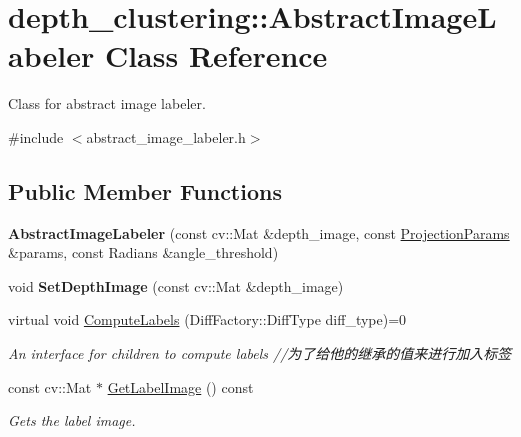 \hypertarget{classdepth__clustering_1_1AbstractImageLabeler}{\section{depth\-\_\-clustering\-:\-:Abstract\-Image\-Labeler Class Reference}
\label{classdepth__clustering_1_1AbstractImageLabeler}
}


Class for abstract image labeler.  




{\ttfamily \#include $<$abstract\-\_\-image\-\_\-labeler.\-h$>$}

\subsection*{Public Member Functions}
\begin{DoxyCompactItemize}
\item 
\hypertarget{classdepth__clustering_1_1AbstractImageLabeler_ac01889e0a3d088cf7627809f4d8aab19}{{\bfseries Abstract\-Image\-Labeler} (const cv\-::\-Mat \&depth\-\_\-image, const \hyperlink{classdepth__clustering_1_1ProjectionParams}{Projection\-Params} \&params, const Radians \&angle\-\_\-threshold)}\label{classdepth__clustering_1_1AbstractImageLabeler_ac01889e0a3d088cf7627809f4d8aab19}

\item 
\hypertarget{classdepth__clustering_1_1AbstractImageLabeler_a28e8e094c9a47a02a2ce9eabef9526e6}{void {\bfseries Set\-Depth\-Image} (const cv\-::\-Mat \&depth\-\_\-image)}\label{classdepth__clustering_1_1AbstractImageLabeler_a28e8e094c9a47a02a2ce9eabef9526e6}

\item 
\hypertarget{classdepth__clustering_1_1AbstractImageLabeler_ac66f0554e1c988ab0bf413a2f17d3905}{virtual void \hyperlink{classdepth__clustering_1_1AbstractImageLabeler_ac66f0554e1c988ab0bf413a2f17d3905}{Compute\-Labels} (Diff\-Factory\-::\-Diff\-Type diff\-\_\-type)=0}\label{classdepth__clustering_1_1AbstractImageLabeler_ac66f0554e1c988ab0bf413a2f17d3905}

\begin{DoxyCompactList}\small\item\em An interface for children to compute labels //为了给他的继承的值来进行加入标签 \end{DoxyCompactList}\item 
const cv\-::\-Mat $\ast$ \hyperlink{classdepth__clustering_1_1AbstractImageLabeler_abc25b75282cce43684e2a469e647d83b}{Get\-Label\-Image} () const 
\begin{DoxyCompactList}\small\item\em Gets the label image. \end{DoxyCompactList}\end{DoxyCompactItemize}
